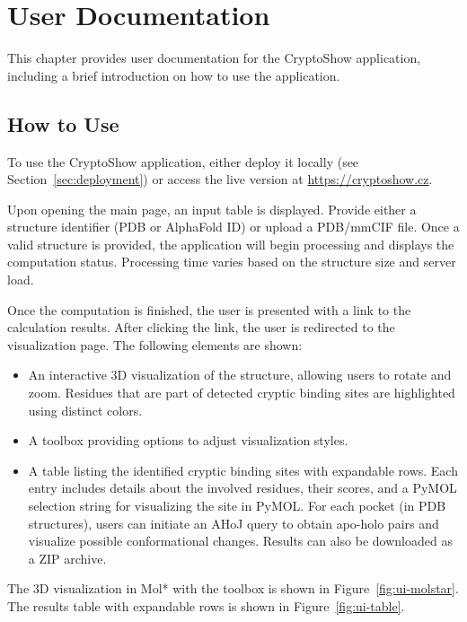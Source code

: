 \chapter{User Documentation}
\label{chap:user-documentation}

This chapter provides user documentation for the CryptoShow application, including a brief introduction on how to use the application.

\section{How to Use}
\label{sec:how-to-use}

To use the CryptoShow application, either deploy it locally (see Section~\ref{sec:deployment}) or access the live version at \url{https://cryptoshow.cz}.

Upon opening the main page, an input table is displayed. Provide either a structure identifier (PDB or AlphaFold ID) or upload a PDB/mmCIF file. Once a valid structure is provided, the application will begin processing and displays the computation status. Processing time varies based on the structure size and server load.

Once the computation is finished, the user is presented with a link to the calculation results. After clicking the link, the user is redirected to the visualization page. The following elements are shown:

\begin{itemize}
    \item An interactive 3D visualization of the structure, allowing users to rotate and zoom. Residues that are part of detected cryptic binding sites are highlighted using distinct colors.
    \item A toolbox providing options to adjust visualization styles.
    \item A table listing the identified cryptic binding sites with expandable rows. Each entry includes details about the involved residues, their scores, and a PyMOL selection string for visualizing the site in PyMOL. For each pocket (in PDB structures), users can initiate an AHoJ query to obtain apo-holo pairs and visualize possible conformational changes. Results can also be downloaded as a ZIP archive.
\end{itemize}

The 3D visualization in Mol* with the toolbox is shown in Figure~\ref{fig:ui-molstar}. The results table with expandable rows is shown in Figure~\ref{fig:ui-table}.

